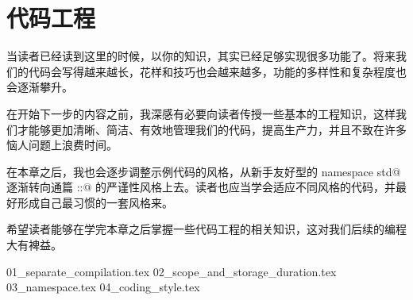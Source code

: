 \chapter{代码工程}
当读者已经读到这里的时候，以你的知识，其实已经足够实现很多功能了。将来我们的代码会写得越来越长，花样和技巧也会越来越多，功能的多样性和复杂程度也会逐渐攀升。\par
在开始下一步的内容之前，我深感有必要向读者传授一些基本的工程知识，这样我们才能够更加清晰、简洁、有效地管理我们的代码，提高生产力，并且不致在许多恼人问题上浪费时间。\par
在本章之后，我也会逐步调整示例代码的风格，从新手友好型的 \lstinline@using namespace std@ 逐渐转向通篇 \lstinline@std::@ 的严谨性风格上去。读者也应当学会适应不同风格的代码，并最好形成自己最习惯的一套风格来。\par
希望读者能够在学完本章之后掌握一些代码工程的相关知识，这对我们后续的编程大有裨益。\par
{01_separate_compilation.tex}
{02_scope_and_storage_duration.tex}
{03_namespace.tex}
{04_coding_style.tex}